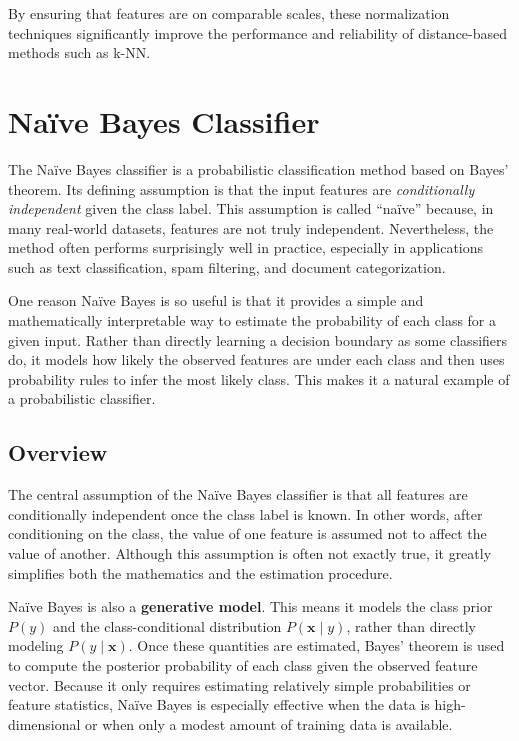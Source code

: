 \documentclass{article}
\begin{document}
By ensuring that features are on comparable scales, these normalization techniques significantly improve the performance and reliability of distance-based methods such as k-NN.

\section{Na\"ive Bayes Classifier}

The Na\"ive Bayes classifier is a probabilistic classification method based on Bayes' theorem. Its defining assumption is that the input features are \textit{conditionally independent} given the class label. This assumption is called ``na\"ive'' because, in many real-world datasets, features are not truly independent. Nevertheless, the method often performs surprisingly well in practice, especially in applications such as text classification, spam filtering, and document categorization.

One reason Na\"ive Bayes is so useful is that it provides a simple and mathematically interpretable way to estimate the probability of each class for a given input. Rather than directly learning a decision boundary as some classifiers do, it models how likely the observed features are under each class and then uses probability rules to infer the most likely class. This makes it a natural example of a probabilistic classifier.

\subsection{Overview}

The central assumption of the Na\"ive Bayes classifier is that all features are conditionally independent once the class label is known. In other words, after conditioning on the class, the value of one feature is assumed not to affect the value of another. Although this assumption is often not exactly true, it greatly simplifies both the mathematics and the estimation procedure.

Na\"ive Bayes is also a \textbf{generative model}. This means it models the class prior \(P(y)\) and the class-conditional distribution \(P(\mathbf{x}\mid y)\), rather than directly modeling \(P(y\mid \mathbf{x})\). Once these quantities are estimated, Bayes' theorem is used to compute the posterior probability of each class given the observed feature vector. Because it only requires estimating relatively simple probabilities or feature statistics, Na\"ive Bayes is especially effective when the data is high-dimensional or when only a modest amount of training data is available.
\end{document}

